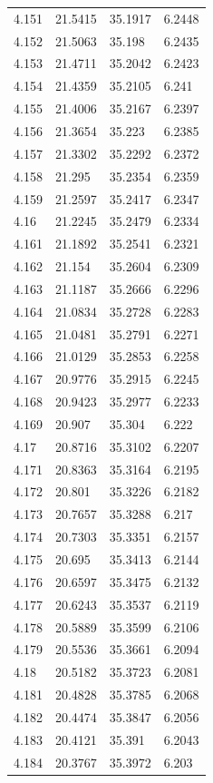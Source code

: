 \begin{tabular}{llll}
4.151 & 21.5415 & 35.1917 & 6.2448 \\
4.152 & 21.5063 & 35.198 & 6.2435 \\
4.153 & 21.4711 & 35.2042 & 6.2423 \\
4.154 & 21.4359 & 35.2105 & 6.241 \\
4.155 & 21.4006 & 35.2167 & 6.2397 \\
4.156 & 21.3654 & 35.223 & 6.2385 \\
4.157 & 21.3302 & 35.2292 & 6.2372 \\
4.158 & 21.295 & 35.2354 & 6.2359 \\
4.159 & 21.2597 & 35.2417 & 6.2347 \\
4.16 & 21.2245 & 35.2479 & 6.2334 \\
4.161 & 21.1892 & 35.2541 & 6.2321 \\
4.162 & 21.154 & 35.2604 & 6.2309 \\
4.163 & 21.1187 & 35.2666 & 6.2296 \\
4.164 & 21.0834 & 35.2728 & 6.2283 \\
4.165 & 21.0481 & 35.2791 & 6.2271 \\
4.166 & 21.0129 & 35.2853 & 6.2258 \\
4.167 & 20.9776 & 35.2915 & 6.2245 \\
4.168 & 20.9423 & 35.2977 & 6.2233 \\
4.169 & 20.907 & 35.304 & 6.222 \\
4.17 & 20.8716 & 35.3102 & 6.2207 \\
4.171 & 20.8363 & 35.3164 & 6.2195 \\
4.172 & 20.801 & 35.3226 & 6.2182 \\
4.173 & 20.7657 & 35.3288 & 6.217 \\
4.174 & 20.7303 & 35.3351 & 6.2157 \\
4.175 & 20.695 & 35.3413 & 6.2144 \\
4.176 & 20.6597 & 35.3475 & 6.2132 \\
4.177 & 20.6243 & 35.3537 & 6.2119 \\
4.178 & 20.5889 & 35.3599 & 6.2106 \\
4.179 & 20.5536 & 35.3661 & 6.2094 \\
4.18 & 20.5182 & 35.3723 & 6.2081 \\
4.181 & 20.4828 & 35.3785 & 6.2068 \\
4.182 & 20.4474 & 35.3847 & 6.2056 \\
4.183 & 20.4121 & 35.391 & 6.2043 \\
4.184 & 20.3767 & 35.3972 & 6.203 \\

\end{tabular}
